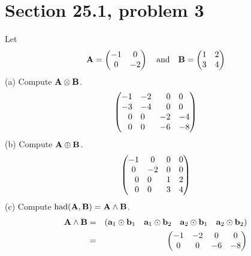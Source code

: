 \section{Section 25.1, problem 3}
Let
$${\bf A}=\left(\begin{matrix}
-1 & 0\cr
0 & -2
\end{matrix}\right)
\quad\hbox{and}\quad
{\bf B}=\left(\begin{matrix}
1 & 2\cr
3 & 4
\end{matrix}\right)
$$
(a) Compute $\bf A\otimes B$.
$$\left(\begin{matrix}
\begin{matrix}-1 & -2\cr -3 & -4\end{matrix}
 & \begin{matrix}0 & 0\cr 0 & 0\end{matrix}\cr
\begin{matrix}0 & 0\cr 0 & 0\end{matrix}
 & \begin{matrix}-2 & -4\cr -6 & -8\end{matrix}
\end{matrix}\right)
$$
(b) Compute $\bf A\oplus B$.
$$\left(\begin{matrix}
\begin{matrix}-1 & 0\cr 0 & -2\end{matrix}
 & \begin{matrix}0 & 0\cr 0 & 0\end{matrix}\cr
\begin{matrix}0 & 0\cr 0 & 0\end{matrix}
 & \begin{matrix}1 & 2\cr 3 & 4\end{matrix}
\end{matrix}\right)
$$
(c) Compute $\mathop{\rm had}(\bf A,B)=A\wedge B$.
\begin{eqnarray*}
{\bf A\wedge B}&=&(\begin{matrix}
{\bf a}_1\odot {\bf b}_1 & {\bf a}_1\odot {\bf b}_2 & {\bf a}_2\odot {\bf b}_1 & {\bf a}_2\odot {\bf b}_2\end{matrix})\\
&=&\left(\begin{matrix}
-1 & -2 & 0 & 0\cr
0 & 0 & -6 & -8
\end{matrix}\right)
\end{eqnarray*}
